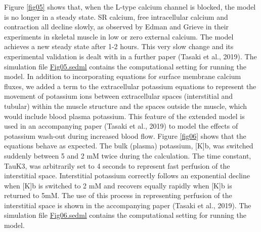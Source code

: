 \documentclass[fleqn,10pt]{physiome}
\begin{document}
Figure \ref{fig05} shows that, when the L-type calcium channel is blocked, the model is no longer in a steady state. SR calcium, free intracellular calcium and contraction all decline slowly, as observed by Edman and Grieve \citep{edman1964role} in their experiments in skeletal muscle in low or zero external calcium. The model achieves a new steady state after 1-2 hours. This very slow change and its experimental validation is dealt with in a further paper (Tasaki et al., 2019). The simulation file \href{https://models.physiomeproject.org/workspace/5c6/file/afd4d5cb20ecdcbc0b10198fe31795520488a34e/Fig05.sedml}{Fig05.sedml} contains the computational setting for running the model.
In addition to incorporating equations for surface membrane calcium fluxes, we added a term to the extracellular potassium equations to represent the movement of potassium ions between extracellular spaces (interstitial and tubular) within the muscle structure and the spaces outside the muscle, which would include blood plasma potassium. This feature of the extended model is used in an accompanying paper (Tasaki et al., 2019) to model the effects of potassium wash-out during increased blood flow. Figure \ref{fig06} shows that the equations behave as expected. The bulk (plasma) potassium, [K]b, was switched suddenly between 5 and 2 mM twice during the calculation. The time constant, TauK3, was arbitrarily set to 4 seconds to represent fast perfusion of the interstitial space. Interstitial potassium correctly follows an exponential decline when [K]b is switched to 2 mM and recovers equally rapidly when [K]b is returned to 5mM. The use of this process in representing perfusion of the interstitial space is shown in the accompanying paper (Tasaki et al., 2019). The simulation file \href{https://models.physiomeproject.org/workspace/5c6/file/afd4d5cb20ecdcbc0b10198fe31795520488a34e/Fig06.sedml}{Fig06.sedml} contains the computational setting for running the model.\newline
\end{document}
